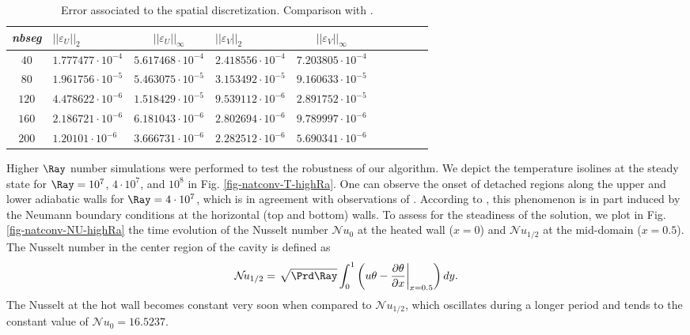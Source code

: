 \begin{table}[!ht]
   \begin{center}
      \begin{tabular}{*{5}{cl}}
         
        {\em nbseg} &  $|| \varepsilon_U ||_{2}$ & $|| \varepsilon_U ||_{\infty}$ & $|| \varepsilon_V ||_{2}$ & $|| \varepsilon_V ||_{\infty}$ \\ \toprule
        $40$ & $1.777477 \cdot 10^{-4}$ & $5.617468 \cdot 10^{-4}$ & $2.418556 \cdot 10^{-4}$ & $7.203805 \cdot 10^{-4}$ \\
        $80$ & $1.961756 \cdot 10^{-5}$ & $5.463075 \cdot 10^{-5}$ & $3.153492 \cdot 10^{-5}$ & $9.160633 \cdot 10^{-5}$ \\
        $120$ & $4.478622 \cdot 10^{-6}$ & $1.518429 \cdot 10^{-5}$ & $9.539112 \cdot 10^{-6}$ & $2.891752 \cdot 10^{-5}$ \\
        $160$ & $2.186721 \cdot 10^{-6}$ & $6.181043 \cdot 10^{-6}$ & $2.802694 \cdot 10^{-6}$ & $9.789997 \cdot 10^{-6}$ \\
        $200$ & $1.20101 \cdot 10^{-6}$ & $3.666731 \cdot 10^{-6}$ & $2.282512 \cdot 10^{-6}$ & $5.690341 \cdot 10^{-6}$ \\
        
      \end{tabular}
   \end{center}
   \caption{Error associated to the spatial discretization. Comparison with \cite{LeQuere91}.}
   \label{tab-mesh-conv-analysis}
\end{table}

Higher $\Ray$ number simulations were performed to test the robustness of our algorithm.
We depict the temperature isolines at the steady state for $\Ray = 10^7$, $4 \cdot 10^7$, and $10^8$ in Fig. \ref{fig-natconv-T-highRa}.
One can observe the onset of detached regions along the upper and lower adiabatic walls for $\Ray = 4 \cdot 10^7$, which is in agreement with observations of \cite{le1985computation}.
According to \cite{le1985computation}, this phenomenon is in part induced by the Neumann boundary conditions at the horizontal (top and bottom) walls.
To assess for the steadiness of the solution, we plot in Fig. \ref{fig-natconv-NU-highRa} the time evolution of the Nusselt number $\mathcal{N}\!u_0$ at the heated wall ($x=0$) and $\mathcal{N}\!u_{1/2}$ at the mid-domain ($x=0.5$).
The Nusselt number in the center region of the cavity is defined as
\begin{equation}
	\mathcal{N}\!u_{1/2} =  \left.  \sqrt{\Prd \Ray} \int_0^1 \left( u \theta - \frac{\partial \theta}{\partial x} \right |_{x=0.5} \right) dy.
\end{equation}
The Nusselt at the hot wall becomes constant very soon when compared to $\mathcal{N}\!u_{1/2}$, which oscillates during a longer period and tends to the constant value of $\mathcal{N}\!u_{0} = 16.5237$.

